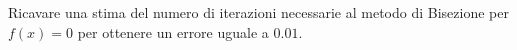 Ricavare una stima del numero di iterazioni necessarie al metodo 
di Bisezione per $f(x)=0$ per ottenere un errore uguale a $0.01$.
